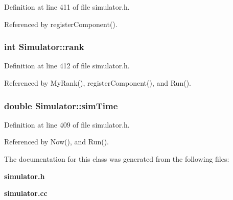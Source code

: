 Definition at line 411 of file simulator.h.

Referenced by registerComponent().
\subsubsection[{rank}]{\setlength{\rightskip}{0pt plus 5cm}int {\bf Simulator::rank}\hspace{0.3cm}{\tt  [static, private]}}\label{classSimulator_c4c86b1cdd6fb0032c0c2f8ee6babc34}




Definition at line 412 of file simulator.h.

Referenced by MyRank(), registerComponent(), and Run().
\subsubsection[{simTime}]{\setlength{\rightskip}{0pt plus 5cm}double {\bf Simulator::simTime}\hspace{0.3cm}{\tt  [static, private]}}\label{classSimulator_a614fd7f680e5577786795d7ae3c077e}




Definition at line 409 of file simulator.h.

Referenced by Now(), and Run().

The documentation for this class was generated from the following files:\begin{CompactItemize}
\item 
{\bf simulator.h}\item 
{\bf simulator.cc}\end{CompactItemize}
